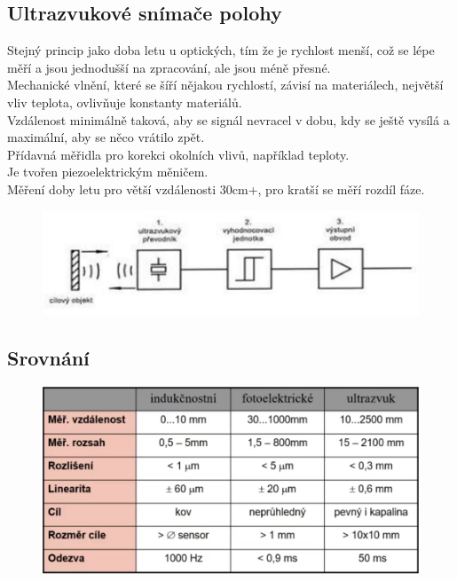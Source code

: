 \subsection{Ultrazvukové snímače polohy}
Stejný princip jako doba letu u optických, tím že je rychlost menší, což se lépe měří a jsou jednodušší na zpracování, ale jsou méně přesné.\\
Mechanické vlnění, které se šíří nějakou rychlostí, závisí na materiálech, největší vliv teplota, ovlivňuje konstanty materiálů.\\
Vzdálenost minimálně taková, aby se signál nevracel v dobu, kdy se ještě vysílá a maximální, aby se něco vrátilo zpět.\\
Přídavná měřidla pro korekci okolních vlivů, například teploty.\\
Je tvořen piezoelektrickým měničem.\\
Měření doby letu pro větší vzdálenosti 30cm+, pro kratší se měří rozdíl fáze.\\
\begin{figure}[h!]
    \centering
    \includegraphics[scale = 0.1]{img/ultrazvPol.png}
\end{figure}

\subsection{Srovnání}
\begin{figure}[h!]
    \centering
    \includegraphics[scale = 0.3]{img/srovnaniPoloh.png}
\end{figure}

